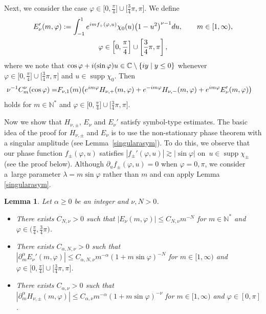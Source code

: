 \documentclass[11pt]{article}
\numberwithin{equation}{section}
\newtheorem{Lemma}[Theorem]{Lemma}
\DeclareMathOperator{\supp}{supp}%
\def\a{\alpha}
\def\f{\varphi}
\def\l{\lambda}
\def\n{\nu}
\def\pa{\partial}
\begin{document}
Next, we consider the case $\f\in \bigl[0,\frac{\pi}{4}\bigr]\cup \bigl[\frac{3}{4}\pi,\pi\bigr]$. We define
\begin{gather*}
E_{\n}'(m,\f):=\int_{-1}^1{\rm e}^{{\rm i}mf_{+}(\f,u)}\chi_{0}(u)\bigl(1-u^2\bigr)^{\n-1}{\rm d}u,\qquad m\in [1,\infty),\\ \f\in \left[0,\frac{\pi}{4}\right]\cup \left[\frac{3}{4}\pi,\pi\right],
\end{gather*}
where we note that $\cos \f+{\rm i}(\sin\f)u\in \mathbb{C}\setminus \{{\rm i}y\mid y\leq 0\}$ whenever $\f\in \bigl[0,\frac{\pi}{4}\bigr]\cup \bigl[\frac{3}{4}\pi,\pi\bigr]$ and $u\in \supp \chi_0$. Then
\begin{align}\label{Gegendecom2}
\n^{-1}C_m^{\n}(\cos\f)=&F_{\n,1}(m)\bigl({\rm e}^{{\rm i}m\f}H_{\n,+}(m,\f)+{\rm e}^{-{\rm i}m\f}H_{\n,-}(m,\f)+{\rm e}^{{\rm i}m\f}E_{\n}'(m,\f) \bigr)
\end{align}
holds for $m\in\mathbb{N}^*$ and $\f\in \bigl[0,\frac{\pi}{4}\bigr]\cup \bigl[\frac{3}{4}\pi,\pi\bigr]$.

Now we show that $H_{\n,\pm}$, $E_{\n}$ and $E_{\n}'$ satisfy symbol-type estimates. The basic idea of the proof for $H_{\n,\pm}$ and $E_{\n}$ is to use the non-stationary phase theorem with a singular amplitude (see Lemma~\ref{singularasym}). To do this, we observe that our phase function $f_{\pm}(\f,u)$ satisfies $|f_{\pm}'(\f,u)|\gtrsim |\sin \f|$ on~${u\in \supp \chi_{\pm}}$ (see the proof below). Although $\pa_u f_{\pm}(\f,u)=0$ when $\f=0,\pi$, we consider a~large parameter $\l=m\sin \f$ rather than $m$ and can apply Lemma \ref{singularasym}.

\begin{Lemma}\label{Gegenlemma}
Let $\a\geq 0$ be an integer and $\n,N>0$.
\begin{itemize}\itemsep=0pt
\item[$(i)$] There exists $C_{N,\n}>0$ such that $|E_{\n}(m,\f)|\leq C_{N,\n}m^{-N}$ for $m\in\mathbb{N}^*$ and $\f\in \bigl(\frac{\pi}{4}, \frac{3}{4}\pi\bigr)$.

\item[$(ii)$] There exists $C_{\a,N,\n}>0$ such that $|\pa_{m}^{\a}E_{\n}'(m,\f)|\leq C_{\a,N,\n}m^{-\a}(1+m\sin\f)^{-N}$ for $m\in[1,\infty)$ and $\f\in \bigl[0,\frac{\pi}{4}\bigr]\cup \bigl[\frac{3}{4}\pi,\pi\bigr]$.

\item[$(iii)$] There exists $C_{\a,\n}>0$ such that $|\pa_{m}^{\a}H_{\n,\pm}(m,\f)|\leq C_{\a,\n}m^{-\a}(1+m\sin\f)^{-\n}$ for $m\in[1,\infty)$ and $\f\in [0,\pi]$.
\end{itemize}
\end{Lemma}
\end{document}
